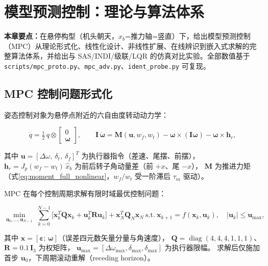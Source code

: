 \section{模型预测控制：理论与算法体系}
\label{sec:mpc}

\noindent\textbf{本章要点：}在悬停构型（机头朝天，$x_b$=推力轴=竖直）下，给出模型预测控制（MPC\cite{rawlings2020model}）从理论形式化、线性化设计、非线性扩展、在线辨识到嵌入式求解的完整算法体系，并给出与 SAS/INDI/级联/LQR 的仿真对比实验。全部数值基于 \texttt{scripts/mpc\_proto.py}、\texttt{mpc\_adv.py}、\texttt{ident\_probe.py} 可复现。

\subsection{MPC 控制问题形式化}
\label{sec:mpc_problem}

姿态控制对象为悬停点附近的六自由度转动动力学：

\begin{equation}
    \dot{q} = \tfrac{1}{2}\, q \otimes \begin{bmatrix} 0 \\ \boldsymbol{\omega} \end{bmatrix},
    \qquad
    \mathbf{I}\,\dot{\boldsymbol{\omega}}
        = \boldsymbol{M}(\mathbf{u}, w_f, w_t) - \boldsymbol{\omega}\times(\mathbf{I}\boldsymbol{\omega}) - \boldsymbol{\omega}\times\mathbf{h}_r,
    \label{eq:mpc_dynamics}
\end{equation}

其中 $\mathbf{u} = [\Delta\omega,\ \delta_t,\ \delta_f]^T$ 为执行器指令（差速、尾摆、前摆），
$\mathbf{h}_r = J_p(w_f - w_t)\,\hat{x}_b$ 为前后转子角动量差（前 $+x$、尾 $-x$），
$\boldsymbol{M}$ 为推进力矩（式\eqref{eq:moment_full_nonlinear}，$w_f/w_t$ 受一阶滞后 $\tau_m$ 驱动）。

MPC 在每个控制周期求解有限时域最优控制问题：

\begin{equation}
    \min_{\mathbf{u}_0,\dots,\mathbf{u}_{N-1}}\;
    \sum_{k=0}^{N-1}\Big[\mathbf{x}_k^T\mathbf{Q}\mathbf{x}_k + \mathbf{u}_k^T\mathbf{R}\mathbf{u}_k\Big]
    + \mathbf{x}_N^T\mathbf{Q}_N\mathbf{x}_N
    \ \text{s.t.}\
    \mathbf{x}_{k+1}=f(\mathbf{x}_k,\mathbf{u}_k),\quad
    |\mathbf{u}_k|\le\mathbf{u}_{\max},
    \label{eq:mpc_ocp}
\end{equation}

其中 $\mathbf{x}=[\boldsymbol{\varepsilon};\,\boldsymbol{\omega}]$（误差四元数矢量分量与角速度），
$\mathbf{Q}=\operatorname{diag}(4,4,4,1,1,1)$、$\mathbf{R}=0.1\,\mathbf{I}_3$ 为权矩阵，
$\mathbf{u}_{\max}=[\Delta\omega_{\max}, \delta_{\max}, \delta_{\max}]$ 为执行器限幅。
求解后仅施加首步 $\mathbf{u}_0$，下周期滚动重解（receding horizon）。

